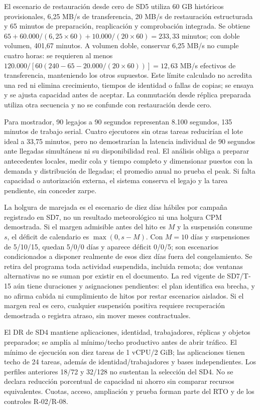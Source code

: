 El escenario de restauración desde cero de SD5 utiliza 60 GB históricos provisionales, 6,25 MB/s de transferencia, 20 MB/s de restauración estructurada y 65 minutos de preparación, reaplicación y comprobación integrada. Se obtiene $65+60.000/(6{,}25\times60)+10.000/(20\times60)=233{,}33$ minutos; con doble volumen, 401,67 minutos. A volumen doble, conservar 6,25 MB/s no cumple cuatro horas: se requieren al menos $120.000/[60(240-65-20.000/(20\times60))]=12{,}63$ MB/s efectivos de transferencia, manteniendo los otros supuestos. Este límite calculado no acredita una red ni elimina crecimiento, tiempos de identidad o fallas de copias; se ensaya y se ajusta capacidad antes de aceptar. La conmutación desde réplica preparada utiliza otra secuencia y no se confunde con restauración desde cero.

Para mostrador, 90 legajos a 90 segundos representan 8.100 segundos, 135 minutos de trabajo serial. Cuatro ejecutores sin otras tareas reducirían el lote ideal a 33,75 minutos, pero no demostrarían la latencia individual de 90 segundos ante llegadas simultáneas ni su disponibilidad real. El análisis obliga a preparar antecedentes locales, medir cola y tiempo completo y dimensionar puestos con la demanda y distribución de llegadas; el promedio anual no prueba el peak. Si falta capacidad o autorización externa, el sistema conserva el legajo y la tarea pendiente, sin conceder zarpe. \parencite[cap.~15, RT-09.01, p.~34; numeral~16.1, decisión~21, p.~38]{sd8-c07}

La holgura de marejada es el escenario de diez días hábiles por campaña registrado en SD7, no un resultado meteorológico ni una holgura CPM demostrada. Si el margen admisible antes del hito es $M$ y la suspensión consume $s$, el déficit de calendario es $\max(0,s-M)$. Con $M=10$ días y suspensiones de 5/10/15, quedan 5/0/0 días y aparece déficit 0/0/5; son escenarios condicionados a disponer realmente de esos diez días fuera del congelamiento. Se retira del programa toda actividad suspendida, incluida remota; dos ventanas alternativas no se suman por existir en el documento. La red vigente de SD7/T-15 aún tiene duraciones y asignaciones pendientes: el plan identifica esa brecha, y no afirma cabida ni cumplimiento de hitos por restar escenarios aislados. Si el margen real es cero, cualquier suspensión positiva requiere recuperación demostrada o registra atraso, sin mover meses contractuales.

El DR de SD4 mantiene aplicaciones, identidad, trabajadores, réplicas y objetos preparados; se amplía al mínimo/techo productivo antes de abrir tráfico. El mínimo de ejecución son diez tareas de 1 vCPU/2 GiB; las aplicaciones tienen techo de 24 tareas, además de identidad/trabajadores y bases independientes. Los perfiles anteriores 18/72 y 32/128 no sustentan la selección del SD4. No se declara reducción porcentual de capacidad ni ahorro sin comparar recursos equivalentes. Cuotas, acceso, ampliación y prueba forman parte del RTO y de los controles R-02/R-08.
